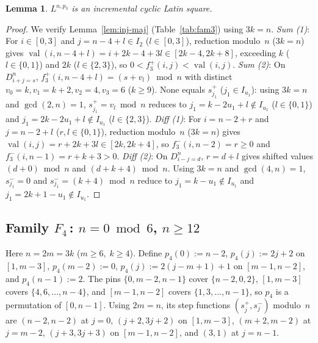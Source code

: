 \documentclass[10pt,a4paper]{article}
\newtheorem{lemma}[theorem]{Lemma}
\theoremstyle{remark}
\newcommand{\val}{\operatorname{val}}
\begin{document}
\begin{lemma}\label{lem:fam3}
$L^{n,p_3}$ is an incremental cyclic Latin square.
\end{lemma}

\begin{proof}
We verify Lemma~\ref{lem:inj-maj} (Table~\ref{tab:fam3}) using $3k = n$.
\emph{Sum (1)}: For $i \in [0,3]$ and $j = n - 4 + l \in I_2$ ($l \in [0,3]$), reduction modulo~$n$
($3k = n$) gives $\val(i,n-4+l) = i + 2k - 4 + 3l \in [2k-4, 2k+8]$, exceeding $k$ ($l \in \{0,1\}$)
and $2k$ ($l \in \{2,3\}$), so $0 < f^+_3(i,j) < \val(i,j)$.
\emph{Sum (2)}: On $D^n_{i+j=s}$, $f^+_3(i,n-4+l) = (s + v_l) \bmod n$ with distinct
$v_0 = k, v_1 = k + 2, v_2 = 4, v_3 = 6$ ($k \ge 9$). None equals $s^+_{j_1}$ ($j_1 \in I_{u_1}$):
using $3k = n$ and $\gcd(2,n) = 1$, $s^+_{j_1} = v_l \bmod n$ reduces to $j_1 = k - 2u_1 + l \notin I_{u_1}$
($l \in \{0,1\}$) and $j_1 = 2k - 2u_1 + l \notin I_{u_1}$ ($l \in \{2,3\}$).
\emph{Diff (1)}: For $i = n - 2 + r$ and $j = n - 2 + l$ ($r, l \in \{0,1\}$), reduction modulo~$n$
($3k = n$) gives $\val(i,j) = r + 2k + 3l \in [2k, 2k+4]$, so $f^-_3(i,n-2) = r \ge 0$ and
$f^-_3(i,n-1) = r + k + 3 > 0$.
\emph{Diff (2)}: On $D^n_{i-j=d}$, $r = d + l$ gives shifted values $(d + 0) \bmod n$ and
$(d + k + 4) \bmod n$. Using $3k = n$ and $\gcd(4,n) = 1$, $s^-_{j_1} = 0$ and
$s^-_{j_1} = (k + 4) \bmod n$ reduce to $j_1 = k - u_1 \notin I_{u_1}$ and
$j_1 = 2k + 1 - u_1 \notin I_{u_1}$.
\end{proof}

\subsection[Family 4]{Family $F_4$\,: $n = 0 \bmod 6$, $n \ge 12$}

Here $n = 2m = 3k$ ($m \ge 6, \; k \ge 4$). Define $p_4(0) := n - 2$, $p_4(j) := 2j + 2$ on
$[1, m-3]$, $p_4(m-2) := 0$, $p_4(j) := 2(j - m + 1) + 1$ on $[m-1, n-2]$, and $p_4(n-1) := 2$. The
pins $\{0, m-2, n-1\}$ cover $\{n-2, 0, 2\}$, $[1,m-3]$ covers $\{4, 6, \dots, n-4\}$, and
$[m-1,n-2]$ covers $\{1, 3, \dots, n-1\}$, so $p_4$ is a permutation of $[0,n-1]$. Using $2m = n$,
its step functions $(s^+_j, s^-_j)$ modulo~$n$ are $(n-2, n-2)$ at $j = 0$, $(j+2, 3j+2)$ on
$[1,m-3]$, $(m+2, m-2)$ at $j = m-2$, $(j+3, 3j+3)$ on $[m-1,n-2]$, and $(3, 1)$ at $j = n-1$.
\end{document}
